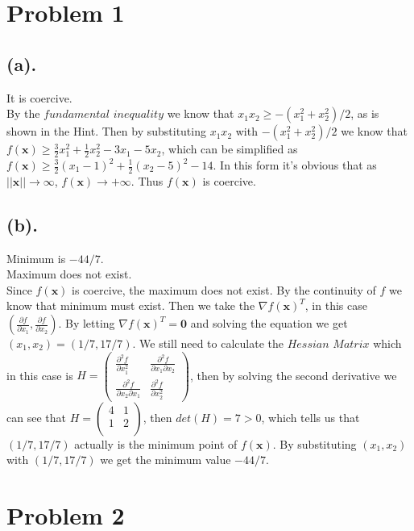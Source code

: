 \documentclass[12pt,letterpaper]{article}
\begin{document}
\section*{Problem 1}
\subsection*{(a).}
It is coercive.\\
By the $fundamental$ $inequality$ we know that $x_{1}x_{2}\geq -(x_{1}^{2}+x_{2}^{2})/2$, as is shown in the Hint. Then by substituting $x_{1}x_{2}$ with $-(x_{1}^{2}+x_{2}^{2})/2$ we know that $f(\boldsymbol{x})\geq \frac{3}{2}x_{1}^{2}+\frac{1}{2}x_{2}^{2}-3x_{1}-5x_{2}$, which can be simplified as $f(\boldsymbol{x})\geq \frac{3}{2}(x_{1}-1)^{2}+\frac{1}{2}(x_{2}-5)^{2}-14$. In this form it's obvious that as $||\boldsymbol{x}||\rightarrow\infty$,   $f(\boldsymbol{x})\rightarrow+\infty$. Thus $f(\boldsymbol{x})$ is coercive.
\subsection*{(b).}
Minimum is $-44/7$.\\
Maximum does not exist.\\
Since $f(\boldsymbol{x})$ is coercive, the maximum does not exist. By the continuity of $f$ we know that minimum must exist. Then we take the $\nabla f(\boldsymbol{x})^{T}$, in this case $(\frac{\partial f}{\partial x_{1}},\frac{\partial f}{\partial x_{2}})$. By letting $\nabla f(\boldsymbol{x})^{T}=\boldsymbol{0}$ and solving the equation we get $(x_{1},x_{2})=(1/7,17/7)$. We still need to calculate the $Hessian$ $Matrix$ which in this case is 
$H=\begin{pmatrix}
    \frac{\partial^{2}f}{\partial x_{1}^{2}} & \frac{\partial^{2}f}{\partial x_{1}\partial x_{2}} \\
    \frac{\partial^{2}f}{\partial x_{2}\partial x_{1}} & \frac{\partial^{2}f}{\partial x_{2}^{2}}
\end{pmatrix}$, then by solving the second derivative we can see that 
$H=\begin{pmatrix}
4&1\\
1&2\\
\end{pmatrix}$, then $det(H)=7>0$, which tells us that $(1/7,17/7)$ actually is the minimum point of $f(\boldsymbol{x})$. By substituting $(x_{1},x_{2})$ with $(1/7,17/7)$ we get the minimum value $-44/7$.
\section*{Problem 2}
\end{document}
